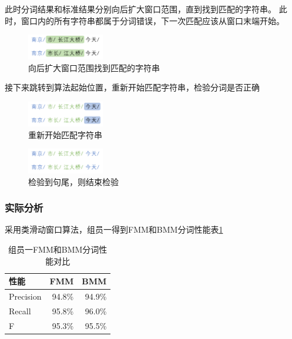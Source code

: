 此时分词结果和标准结果分别向后扩大窗口范围，直到找到匹配的字符串。
此时，窗口内的所有字符串都属于分词错误，下一次匹配应该从窗口末端开始。

\begin{figure}[H]
  \centering
  \includegraphics[width=0.3\textwidth]{figures/figure_04.png}
  \caption{向后扩大窗口范围找到匹配的字符串}
\end{figure}

接下来跳转到算法起始位置，重新开始匹配字符串，检验分词是否正确

\begin{figure}[H]
  \centering
  \includegraphics[width=0.3\textwidth]{figures/figure_05.png}
  \caption{重新开始匹配字符串}
\end{figure}
\begin{figure}[H]
  \centering
  \includegraphics[width=0.3\textwidth]{figures/figure_06.png}
  \caption{检验到句尾，则结束检验}
\end{figure}

\subsubsection{实际分析}

采用类滑动窗口算法，组员一得到FMM和BMM分词性能表\ref{seg_evaluate}

\begin{table}[H]
  \centering
  \begin{tabular}{lrr}
    \hline
    \textbf{性能} & \textbf{FMM} & \textbf{BMM} \\
    \hline
    Precision     & 94.8\%       & 94.9\%       \\
    Recall        & 95.8\%       & 96.0\%       \\
    F             & 95.3\%       & 95.5\%       \\
    \hline
  \end{tabular}
  \caption{组员一FMM和BMM分词性能对比}
  \label{seg_evaluate}
\end{table}

